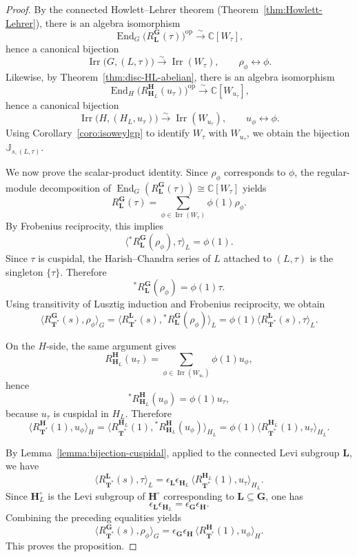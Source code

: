 \documentclass{amsart}
\theoremstyle{plain}
\numberwithin{equation}{section}
\theoremstyle{definition}
\newcommand{\op}{\operatorname{op}}
\newcommand{\End}{\operatorname{End}}
\newcommand{\Irr}{\operatorname{Irr}}
\newcommand{\J}{\mathbb{J}}
\newcommand{\bG}{\mathbf{G}}
\newcommand{\bL}{\mathbf{L}}
\newcommand{\bT}{\mathbf{T}}
\newcommand{\bH}{\mathbf{H}}
\newcommand{\C}{\mathbb{C}}
\begin{document}
\begin{proof}
By the connected Howlett--Lehrer theorem
(Theorem~\ref{thm:Howlett-Lehrer}), there is an algebra isomorphism
\[
\End_G\!\bigl(R_{\bL}^{\bG}(\tau)\bigr)^{\op}\xrightarrow{\sim}\C[W_\tau],
\]
hence a canonical bijection
\[
\Irr\bigl(G,(L,\tau)\bigr)\xrightarrow{\sim}\Irr(W_\tau),
\qquad
\rho_\phi \longleftrightarrow \phi.
\]
Likewise, by
Theorem~\ref{thm:disc-HL-abelian}, there is an algebra isomorphism
\[
\End_H\!\bigl(R_{\bH_L}^{\bH}(u_\tau)\bigr)^{\op}\xrightarrow{\sim}\C[W_{u_\tau}],
\]
hence a canonical bijection
\[
\Irr\bigl(H,(H_L,u_\tau)\bigr)\xrightarrow{\sim}\Irr(W_{u_\tau}),
\qquad
u_\phi \longleftrightarrow \phi.
\]
Using Corollary~\ref{coro:isoweylgp} to identify \(W_\tau\) with \(W_{u_\tau}\), we
obtain the bijection \(\J_{s,(L,\tau)}\).

We now prove the scalar-product identity. Since \(\rho_\phi\) corresponds to \(\phi\),
the regular-module decomposition of
\(\End_G(R_{\bL}^{\bG}(\tau))\cong \C[W_\tau]\) yields
\[
R_{\bL}^{\bG}(\tau)
=
\sum_{\phi\in \Irr(W_\tau)} \phi(1)\rho_\phi.
\]
By Frobenius reciprocity, this implies
\[
\bigl\langle {}^*R_{\bL}^{\bG}(\rho_\phi),\tau\bigr\rangle_L
=
\phi(1).
\]
Since \(\tau\) is cuspidal, the Harish--Chandra series of \(L\) attached to
\((L,\tau)\) is the singleton \(\{\tau\}\). Therefore
\[
{}^*R_{\bL}^{\bG}(\rho_\phi)=\phi(1)\tau.
\]
Using transitivity of Lusztig induction and Frobenius reciprocity, we obtain
\[
\bigl\langle R_{\bT^*}^{\bG}(s),\rho_\phi\bigr\rangle_G
=
\bigl\langle R_{\bT^*}^{\bL}(s),{}^*R_{\bL}^{\bG}(\rho_\phi)\bigr\rangle_L
=
\phi(1)\bigl\langle R_{\bT^*}^{\bL}(s),\tau\bigr\rangle_L.
\]

On the \(H\)-side, the same argument gives
\[
R_{\bH_L}^{\bH}(u_\tau)
=
\sum_{\phi\in \Irr(W_{u_\tau})} \phi(1)u_\phi,
\]
hence
\[
{}^*R_{\bH_L}^{\bH}(u_\phi)=\phi(1)u_\tau,
\]
because \(u_\tau\) is cuspidal in \(H_L\). Therefore
\[
\bigl\langle R_{\bT^*}^{\bH}(1),u_\phi\bigr\rangle_H
=
\bigl\langle R_{\bT^*}^{\bH_L}(1),{}^*R_{\bH_L}^{\bH}(u_\phi)\bigr\rangle_{H_L}
=
\phi(1)\bigl\langle R_{\bT^*}^{\bH_L}(1),u_\tau\bigr\rangle_{H_L}.
\]

By Lemma~\ref{lemma:bijection-cuspidal}, applied to the connected Levi subgroup
\(\bL\), we have
\[
\bigl\langle R_{\bT^*}^{\bL}(s),\tau\bigr\rangle_L
=
\epsilon_{\bL}\epsilon_{\bH_L}\,
\bigl\langle R_{\bT^*}^{\bH_L}(1),u_\tau\bigr\rangle_{H_L}.
\]
Since \(\bH_L^\circ\) is the Levi subgroup of \(\bH^\circ\) corresponding to
\(\bL\subseteq \bG\), one has
\[
\epsilon_{\bL}\epsilon_{\bH_L}=\epsilon_{\bG}\epsilon_{\bH}.
\]
Combining the preceding equalities yields
\[
\bigl\langle R_{\bT^*}^{\bG}(s),\rho_\phi\bigr\rangle_G
=
\epsilon_{\bG}\epsilon_{\bH}\,
\bigl\langle R_{\bT^*}^{\bH}(1),u_\phi\bigr\rangle_H.
\]
This proves the proposition.
\end{proof}
\end{document}
